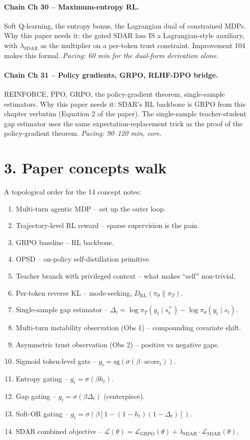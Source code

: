 \documentclass[11pt]{article}
\newcommand{\Lsdar}{\mathcal{L}_{\mathrm{SDAR}}}
\newcommand{\Lgrpo}{\mathcal{L}_{\mathrm{GRPO}}}
\begin{document}
\paragraph{Chain Ch 30 -- Maximum-entropy RL.} Soft Q-learning, the entropy bonus, the Lagrangian dual of constrained MDPs. Why this paper needs it: the gated SDAR loss IS a Lagrangian-style auxiliary, with $\lambda_{\mathrm{SDAR}}$ as the multiplier on a per-token trust constraint. Improvement 104 makes this formal. \emph{Pacing: 60 min for the dual-form derivation alone.}

\paragraph{Chain Ch 31 -- Policy gradients, GRPO, RLHF-DPO bridge.} REINFORCE, PPO, GRPO, the policy-gradient theorem, single-sample estimators. Why this paper needs it: SDAR's RL backbone is GRPO from this chapter verbatim (Equation 2 of the paper). The single-sample teacher-student gap estimator uses the same expectation-replacement trick as the proof of the policy-gradient theorem. \emph{Pacing: 90--120 min, core.}

\section*{3. Paper concepts walk}

A topological order for the 14 concept notes:
\begin{enumerate}
  \item Multi-turn agentic MDP -- set up the outer loop.
  \item Trajectory-level RL reward -- sparse supervision is the pain.
  \item GRPO baseline -- RL backbone.
  \item OPSD -- on-policy self-distillation primitive.
  \item Teacher branch with privileged context -- what makes ``self'' non-trivial.
  \item Per-token reverse KL -- mode-seeking, $D_{\mathrm{KL}}(\pi_\theta \| \pi_T)$.
  \item Single-sample gap estimator -- $\Delta_t = \log \pi_T(y_t \mid s_t^+) - \log \pi_\theta(y_t \mid s_t)$.
  \item Multi-turn instability observation (Obs 1) -- compounding covariate shift.
  \item Asymmetric trust observation (Obs 2) -- positive vs negative gaps.
  \item Sigmoid token-level gate -- $g_t = \mathrm{sg}(\sigma(\beta \cdot \mathrm{score}_t))$.
  \item Entropy gating -- $g_t = \sigma(\beta h_t)$.
  \item Gap gating -- $g_t = \sigma(\beta \Delta_t)$ (centerpiece).
  \item Soft-OR gating -- $g_t = \sigma(\beta[1 - (1-h_t)(1-\Delta_t)])$.
  \item SDAR combined objective -- $\mathcal{L}(\theta) = \Lgrpo(\theta) + \lambda_{\mathrm{SDAR}} \cdot \Lsdar(\theta)$.
\end{enumerate}
\end{document}
